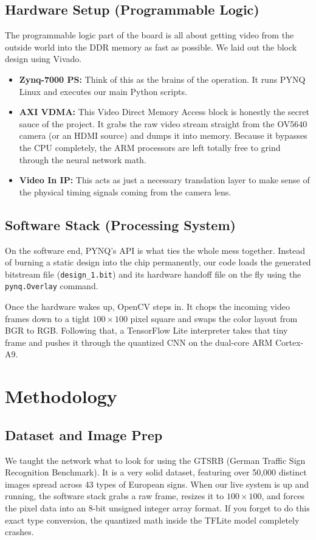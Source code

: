 \documentclass[conference]{IEEEtran}
\begin{document}
\subsection{Hardware Setup (Programmable Logic)}
The programmable logic part of the board is all about getting video from the outside world into the DDR memory as fast as possible. We laid out the block design using Vivado. 
\begin{itemize}
    \item \textbf{Zynq-7000 PS:} Think of this as the brains of the operation. It runs PYNQ Linux and executes our main Python scripts.
    \item \textbf{AXI VDMA:} This Video Direct Memory Access block is honestly the secret sauce of the project. It grabs the raw video stream straight from the OV5640 camera (or an HDMI source) and dumps it into memory. Because it bypasses the CPU completely, the ARM processors are left totally free to grind through the neural network math.
    \item \textbf{Video In IP:} This acts as just a necessary translation layer to make sense of the physical timing signals coming from the camera lens.
\end{itemize}

\subsection{Software Stack (Processing System)}
On the software end, PYNQ's API is what ties the whole mess together. Instead of burning a static design into the chip permanently, our code loads the generated bitstream file (\texttt{design\_1.bit}) and its hardware handoff file on the fly using the \texttt{pynq.Overlay} command. 

Once the hardware wakes up, OpenCV steps in. It chops the incoming video frames down to a tight $100 \times 100$ pixel square and swaps the color layout from BGR to RGB. Following that, a TensorFlow Lite interpreter takes that tiny frame and pushes it through the quantized CNN on the dual-core ARM Cortex-A9.

\section{Methodology}

\subsection{Dataset and Image Prep}
We taught the network what to look for using the GTSRB (German Traffic Sign Recognition Benchmark). It is a very solid dataset, featuring over 50,000 distinct images spread across 43 types of European signs. When our live system is up and running, the software stack grabs a raw frame, resizes it to $100 \times 100$, and forces the pixel data into an 8-bit unsigned integer array format. If you forget to do this exact type conversion, the quantized math inside the TFLite model completely crashes.
\end{document}
